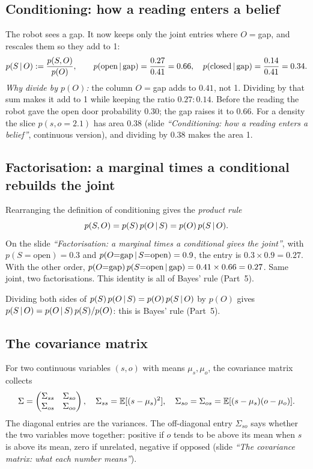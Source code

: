 \documentclass[11pt]{article}
\newcommand{\slide}[1]{\textit{``#1''}}
\begin{document}
\subsection*{Conditioning: how a reading enters a belief}
The robot sees a gap. It now keeps only the joint entries where $O=$gap, and rescales them so they add to 1:
\[
p(S\,|\, O):=\frac{p(S,O)}{p(O)},\qquad p(\text{open}\,|\,\text{gap})=\frac{0.27}{0.41}=0.66,\quad p(\text{closed}\,|\,\text{gap})=\frac{0.14}{0.41}=0.34 .
\]
\emph{Why divide by $p(O)$:} the column $O=$gap adds to $0.41$, not 1. Dividing by that sum makes it add to 1 while keeping the ratio $0.27:0.14$.
Before the reading the robot gave the open door probability 0.30; the gap raises it to 0.66. For a density the slice $p(s,o{=}2.1)$ has area $0.38$ (slide \slide{Conditioning: how a reading enters a belief}, continuous version), and dividing by $0.38$ makes the area 1.

\subsection*{Factorisation: a marginal times a conditional rebuilds the joint}
Rearranging the definition of conditioning gives the \emph{product rule}
\[
p(S,O)=p(S)\,p(O\,|\, S)=p(O)\,p(S\,|\, O).
\]
On the slide \slide{Factorisation: a marginal times a conditional gives the joint}, with $p(S{=}\text{open})=0.3$ and $p(O{=}\text{gap}\,|\, S{=}\text{open})=0.9$, the entry is $0.3\times0.9=0.27$.
With the other order, $p(O{=}\text{gap})\,p(S{=}\text{open}\,|\,\text{gap})=0.41\times0.66=0.27$. Same joint, two factorisations. This identity is all of Bayes' rule (Part~5).

Dividing both sides of $p(S)\,p(O\,|\, S)=p(O)\,p(S\,|\, O)$ by $p(O)$ gives $p(S\,|\, O)=p(O\,|\, S)\,p(S)/p(O)$: this is Bayes' rule (Part~5).


\subsection*{The covariance matrix}
For two continuous variables $(s,o)$ with means $\mu_s,\mu_o$, the covariance matrix collects
\[
\Sigma=\begin{pmatrix}\Sigma_{ss}&\Sigma_{so}\\\Sigma_{os}&\Sigma_{oo}\end{pmatrix},\quad
\Sigma_{ss}=\mathbb{E}[(s-\mu_s)^2],\quad \Sigma_{so}=\Sigma_{os}=\mathbb{E}[(s-\mu_s)(o-\mu_o)].
\]
The diagonal entries are the variances. The off-diagonal entry $\Sigma_{so}$ says whether the two variables move together: positive if $o$ tends to be above its mean when $s$ is above its mean, zero if unrelated, negative if opposed (slide \slide{The covariance matrix: what each number means}).
\end{document}
